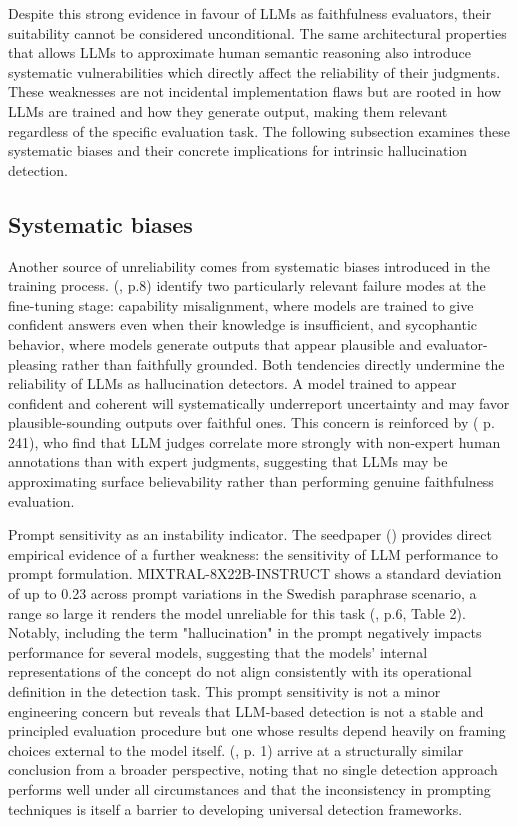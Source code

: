 \documentclass[
  seminar,   	 
  english,   	 
  titlepage=on,
  captions=tableheadings
]{ttlab-qualify}
\begin{document}
Despite this strong evidence in favour of LLMs as faithfulness evaluators, their suitability cannot be considered unconditional. The same architectural properties that allows LLMs to approximate human semantic reasoning also introduce systematic vulnerabilities which directly affect the reliability of their judgments. These weaknesses are not incidental implementation flaws but are rooted in how LLMs are trained and how they generate output, making them relevant regardless of the specific evaluation task. The following subsection examines these systematic biases and their concrete implications for intrinsic hallucination detection.

\subsection{Systematic biases}

Another source of unreliability comes from systematic biases introduced in the training process. (\cite{Alansari2025LLMHallucinationSurvey}, p.8) identify two particularly relevant failure modes at the fine-tuning stage: capability misalignment, where models are trained to give confident answers even when their knowledge is insufficient, and sycophantic behavior, where models generate outputs that appear plausible and evaluator-pleasing rather than faithfully grounded. Both tendencies directly undermine the reliability of LLMs as hallucination detectors. A model trained to appear confident and coherent will systematically underreport uncertainty and may favor plausible-sounding outputs over faithful ones. This concern is reinforced by (\cite{Bavaresco2025JudgeBench} p. 241), who find that LLM judges correlate more strongly with non-expert human annotations than with expert judgments, suggesting that LLMs may be approximating surface believability rather than performing genuine faithfulness evaluation.

Prompt sensitivity as an instability indicator. The seedpaper (\cite{Gogoulou2025LLMHallucinationDetection}) provides direct empirical evidence of a further weakness: the sensitivity of LLM performance to prompt formulation. MIXTRAL-8X22B-INSTRUCT shows a standard deviation of up to 0.23 across prompt variations in the Swedish paraphrase scenario, a range so large it renders the model unreliable for this task (\cite{Gogoulou2025LLMHallucinationDetection}, p.6, Table 2). Notably, including the term "hallucination" in the prompt negatively impacts performance for several models, suggesting that the models' internal representations of the concept do not align consistently with its operational definition in the detection task. This prompt sensitivity is not a minor engineering concern but reveals that LLM-based detection is not a stable and principled evaluation procedure but one whose results depend heavily on framing choices external to the model itself. (\cite{Alansari2025LLMHallucinationSurvey}, p. 1) arrive at a structurally similar conclusion from a broader perspective, noting that no single detection approach performs well under all circumstances and that the inconsistency in prompting techniques is itself a barrier to developing universal detection frameworks.
\end{document}

